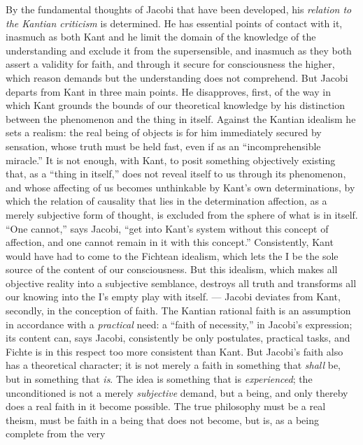 By the fundamental thoughts of Jacobi that have been developed, his
\emph{relation to the Kantian criticism} is determined. He has
essential points of contact with it, inasmuch as both Kant and he limit
the domain of the knowledge of the understanding and exclude it from
the supersensible, and inasmuch as they both assert a validity for
faith, and through it secure for consciousness the higher, which reason
demands but the understanding does not comprehend. But Jacobi departs
from Kant in three main points. He disapproves, first, of the way in
which Kant grounds the bounds of our theoretical knowledge by his
distinction between the phenomenon and the thing in itself. Against the
Kantian idealism he sets a realism: the real being of objects is for
him immediately secured by sensation, whose truth must be held fast,
even if as an ``incomprehensible miracle.'' It is not enough, with Kant,
to posit something objectively existing that, as a ``thing in
itself,'' does not reveal itself to us through its phenomenon, and
whose affecting of us becomes unthinkable by Kant's own determinations,
by which the relation of causality that lies in the determination
affection, as a merely subjective form of thought, is excluded
from the sphere of what is in itself. ``One cannot,'' says
Jacobi, ``get into Kant's system without this concept of affection, and
one cannot remain in it with this concept.'' Consistently, Kant would
have had to come to the Fichtean idealism, which lets the I be the sole
source of the content of our consciousness. But this idealism, which
makes all objective reality into a subjective semblance, destroys all
truth and transforms all our knowing into the I's empty play with
itself. --- Jacobi deviates from Kant, secondly, in the conception of
faith. The Kantian rational faith is an assumption in accordance with a
\emph{practical} need: a ``faith of necessity,'' in Jacobi's
expression; its content can, says Jacobi, consistently be only
postulates, practical tasks, and Fichte is in this respect too more
consistent than Kant. But Jacobi's faith also has a theoretical
character; it is not merely a faith in something that \emph{shall} be,
but in something that \emph{is}. The idea is something that is
\emph{experienced}; the unconditioned is not a merely \emph{subjective}
demand, but a being, and only thereby does a real faith in it become
possible. The true philosophy must be a real theism, must be faith in a
being that does not become, but is, as a being complete from the very
